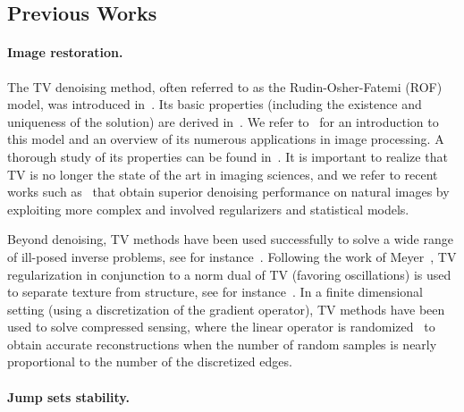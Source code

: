 \subsection{Previous Works}
\label{sec-pw}


\paragraph{Image restoration.}


The TV denoising method, often referred to as the Rudin-Osher-Fatemi (ROF) model, was introduced in~\cite{rudin1992nonlinear}. Its basic properties (including the existence and uniqueness of the solution) are derived in~\cite{ChambolleLions}. We refer to~\cite{Chambolle10anintroduction} for an introduction to this model and an overview of its numerous applications in image processing. A thorough study of its properties can be found in~\cite{Allard1,Allard2}.
%
It is important to realize that TV is no longer  the state of the art in imaging sciences, and we refer to recent works such as~\cite{Portilla03,BuadesCM05,Aharon06,Dabov07} that obtain superior denoising performance on natural images by exploiting more complex and involved regularizers and statistical models. 




Beyond denoising, TV methods have been used successfully to solve a wide range of ill-posed inverse problems, see for instance~\cite{AcarVogel,ChanMarquina00,ChaventCOV,Malgouyres02}.
%
Following the work of Meyer~\cite{Meyer}, TV regularization in conjunction to a norm dual of TV (favoring oscillations) is used to separate texture from structure, see for instance~\cite{Aujol}.  
%
In a finite dimensional setting (using a discretization of the gradient operator), TV methods have been used to solve compressed sensing, where the linear operator is randomized~\cite{NeedelWard12,Poon15} to obtain accurate reconstructions when the number of random samples is nearly proportional to the number of the discretized edges. 

\paragraph{Jump sets stability.}

